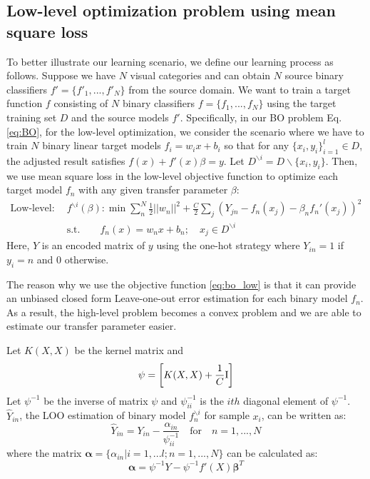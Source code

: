 \subsection{Low-level optimization problem using mean square loss}
To better illustrate our learning scenario, we define our learning process as follows. Suppose we have $N$ visual categories and 
can obtain $N$ source binary classifiers $f'=\{f'_1,...,f'_N\}$ from the source domain. We want to train a target function $f$ consisting of $N$ binary classifiers $f=\{f_1,...,f_N\}$ using the target training set $D$ and the source models $f'$.
Specifically, in our BO problem Eq. \eqref{eq:BO}, for the low-level optimization, we consider the scenario where we have to train $N$ binary linear target models $f_i = w_ix+b_i$ so that for any $\{x_i,y_i\}_{i=1}^l \in D$, the adjusted result satisfies $f(x)+f'(x)\beta = y$. Let $D^{\backslash i} = D\backslash\{x_i,y_i\}$.
Then, we use mean square loss in the low-level objective function to optimize each target model $f_n$ with any given transfer parameter $\beta$:
\begin{equation}\label{eq:bo_low}
\begin{aligned}
\text{Low-level:}\quad&f^{\backslash i}(\beta) : \min \sum_n^N\frac{1}{2}||w_n||^2+\frac{C}{2}\sum_j\left(Y_{jn}-f_n(x_j)-\beta_n f_n'(x_j)\right)^2\\
&\text{s.t.} \qquad f_n(x) = w_nx+b_n; \quad x_j \in D^{\backslash i}
\end{aligned}
\end{equation}
Here, $Y$ is an encoded matrix of $y$ using the one-hot strategy where $Y_{in} =1$ if $y_i=n$ and 0 otherwise.

The reason why we use the objective function \eqref{eq:bo_low} is that it can provide an unbiased closed form Leave-one-out error estimation for each binary model $f_n$\cite{cawley2006leave}. As a result, the high-level problem becomes a convex problem and we are able to estimate our transfer parameter easier.

Let $K(X,X)$ be the kernel matrix and
\begin{equation}\label{eq:linear}
\psi=\left[ 
{K(X,X) + \frac{1}{C}{\rm{I}}} \right]
\end{equation}
Let $\psi^{-1}$ be the inverse of matrix $\psi$ and  $\psi_{ii}^{-1}$ is the $ith$ diagonal element of $\psi^{-1}$. $\hat{Y}_{in}$, the LOO estimation of binary model $f^{\backslash i}_n$ for sample $x_i$, can be written as:
\begin{equation} \label{eq:loo}
{\hat Y_{in}} = {Y_{in}} - \frac{{{\alpha _{in}}}}{{\psi_{ii}^{ - 1}}}\quad {\text{for}}\quad n = 1,...,N
\end{equation}
where the matrix $\boldsymbol{\alpha}=\{\alpha_{in}|i=1,...l;n=1,...,N\}$ can be calculated as:
\begin{equation}
\boldsymbol{\alpha} =\psi^{-1} Y - \psi^{-1} f'(X)\boldsymbol{\beta}^T
\end{equation}


